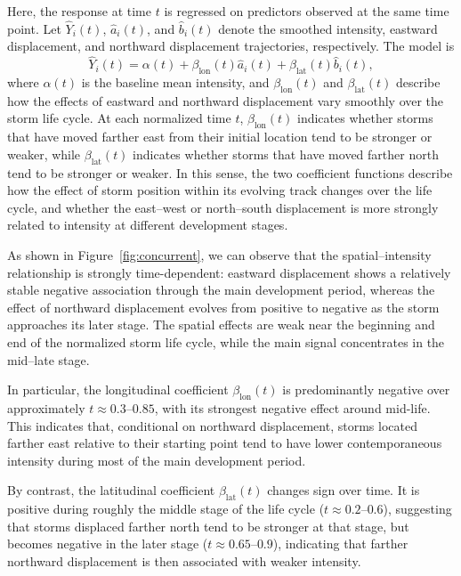 \documentclass{article}
\begin{document}
Here, the response at time $t$ is regressed on predictors observed at the same time point. Let $\hat Y_i(t)$, $\hat a_i(t)$, and $\hat b_i(t)$ denote the smoothed intensity, eastward displacement, and northward displacement trajectories, respectively. The model is
\[
\hat Y_i(t)=\alpha(t)+\beta_{\mathrm{lon}}(t)\hat a_i(t)+\beta_{\mathrm{lat}}(t)\hat b_i(t),
\]
where $\alpha(t)$ is the baseline mean intensity, and $\beta_{\mathrm{lon}}(t)$ and $\beta_{\mathrm{lat}}(t)$ describe how the effects of eastward and northward displacement vary smoothly over the storm life cycle. At each normalized time $t$, $\beta_{\mathrm{lon}}(t)$ indicates whether storms that have moved farther east from their initial location tend to be stronger or weaker, while $\beta_{\mathrm{lat}}(t)$ indicates whether storms that have moved farther north tend to be stronger or weaker. In this sense, the two coefficient functions describe how the effect of storm position within its evolving track changes over the life cycle, and whether the east--west or north--south displacement is more strongly related to intensity at different development stages.


As shown in Figure~\ref{fig:concurrent}, we can observe that the spatial--intensity relationship is strongly time-dependent: eastward displacement shows a relatively stable negative association through the main development period, whereas the effect of northward displacement evolves from positive to negative as the storm approaches its later stage. The spatial effects are weak near the beginning and end of the normalized storm life cycle, while the main signal concentrates in the mid--late stage. 

In particular, the longitudinal coefficient $\beta_{\mathrm{lon}}(t)$ is predominantly negative over approximately $t\approx 0.3$--$0.85$, with its strongest negative effect around mid-life. This indicates that, conditional on northward displacement, storms located farther east relative to their starting point tend to have lower contemporaneous intensity during most of the main development period.

By contrast, the latitudinal coefficient $\beta_{\mathrm{lat}}(t)$ changes sign over time. It is positive during roughly the middle stage of the life cycle ($t\approx 0.2$--$0.6$), suggesting that storms displaced farther north tend to be stronger at that stage, but becomes negative in the later stage ($t\approx 0.65$--$0.9$), indicating that farther northward displacement is then associated with weaker intensity.
\end{document}
